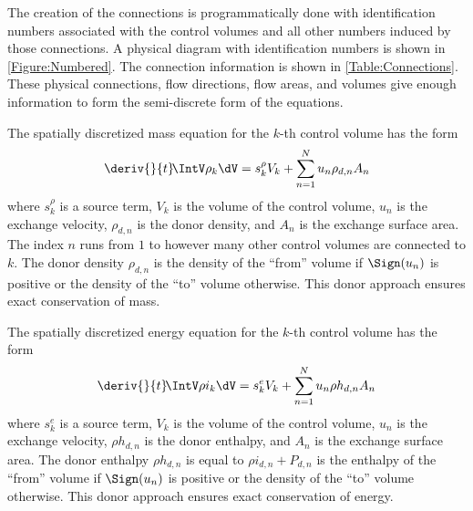 The creation of the connections is programmatically done with identification numbers associated with the control volumes and all other numbers induced by those connections.
A physical diagram with identification numbers is shown in \cref{Figure:Numbered}.
The connection information is shown in \cref{Table:Connections}.
These physical connections, flow directions, flow areas, and volumes give enough information to form the semi-discrete form of the equations.



The spatially discretized mass equation for the $k$-th control volume has the form
\begin{equation}
    \deriv{}{t}\!\IntV \rho_k \dV = s^\rho_k V_k + \sum_{n=1}^{N} u_n \rho_{d,n} A_n  \label{Eqn:SemiMass}
\end{equation}
where $s^\rho_k$ is a source term, $V_k$ is the volume of the control volume, $u_n$ is the exchange velocity, $\rho_{d,n}$ is the donor density, and $A_n$ is the exchange surface area.  The index $n$ runs from $1$ to however many other control volumes are connected to $k$.
The donor density $\rho_{d,n}$ is the density of the ``from'' volume if $\Sign(u_n)$ is positive or the density of the ``to'' volume otherwise.
This donor approach ensures exact conservation of mass.

The spatially discretized energy equation for the $k$-th control volume has the form
\begin{equation}
    \deriv{}{t}\! \IntV \rho i_k \dV = s^e_k V_k + \sum_{n=1}^{N} u_n \rho{h}_{d,n} A_n \label{Eqn:SemiEnergy}
\end{equation}
where $s^e_k$ is a source term, $V_k$ is the volume of the control volume, $u_n$ is the exchange velocity, $\rho{h}_{d,n}$ is the donor enthalpy, and $A_n$ is the exchange surface area.  The donor enthalpy $\rho{h}_{d,n}$ is equal to $\rho{i}_{d,n} + P_{d,n}$ is the enthalpy of the ``from'' volume if $\Sign(u_n)$ is positive or the density of the ``to'' volume otherwise.
This donor approach ensures exact conservation of energy.



